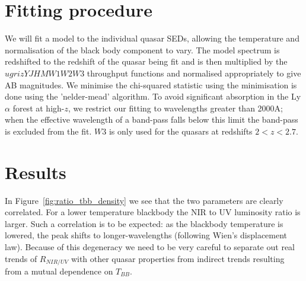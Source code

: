 \section{Fitting procedure}

We will fit a model to the individual quasar \ac{SED}s, allowing the temperature and normalisation of the black body component to vary. 
The model spectrum is redshifted to the redshift of the quasar being fit and is then multiplied by the $ugrizYJHMW1W2W3$ throughput functions and normalised appropriately to give AB magnitudes. 
We minimise the chi-squared statistic using the minimisation is done using the 'nelder-mead' algorithm.
To avoid significant absorption in the Ly$\alpha$ forest at high-$z$, we restrict our fitting to wavelengths greater than 2000A; when the effective wavelength of a band-pass falls below this limit the band-pass is excluded from the fit. 
$W3$ is only used for the quasars at redshifts $2 < z < 2.7$. 

\section{Results}


In Figure~\ref{fig:ratio_tbb_density} we see that the two parameters are clearly correlated. 
For a lower temperature blackbody the \ac{NIR} to UV luminosity ratio is larger. 
Such a correlation is to be expected: as the blackbody temperature is lowered, the peak shifts to longer-wavelengths (following Wien's displacement law). 
Because of this degeneracy we need to be very careful to separate out real trends of $R_{NIR/UV}$ with other quasar properties from indirect trends resulting from a mutual dependence on $T_{BB}$.  

